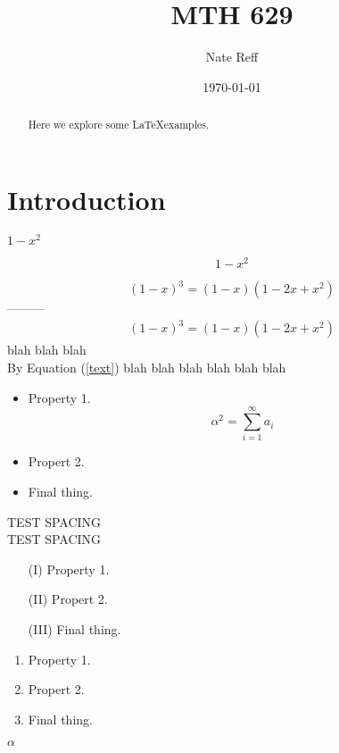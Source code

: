 \documentclass{article}
\title{MTH 629}
\author{Nate Reff }
\date{\today}
\begin{document}
\maketitle

\begin{abstract}
Here we explore some \LaTeX examples.
\end{abstract}

\section*{Introduction}

$1-x^2$

\[1-x^2\]

\[(1-x)^3 = (1-x)(1-2x+x^2)\]
---------
\begin{align}
(1-x)^3 = (1-x)(1-2x+x^2) \label{text}
\end{align}
%
blah blah blah \\
By Equation (\ref{text})
blah blah blah blah blah blah


\begin{itemize} \setlength\itemsep{0em}
    \item Property 1.
    \[ \alpha^2 = \sum_{i=1}^{\infty} a_i \]
    \item Propert 2.
    \item Final thing.
\end{itemize}

\vspace{20pt}
\vfill
TEST \hspace{30pt} SPACING\\
TEST \hfill SPACING


\begin{itemize}
    \item[(I)] Property 1.
    \item[(II)] Propert 2.
    \item[(III)] Final thing.
\end{itemize}

\newpage

\begin{enumerate}
    \item Property 1.
    \item Propert 2.
    \item Final thing.
\end{enumerate}


$\alpha$
\end{document}

